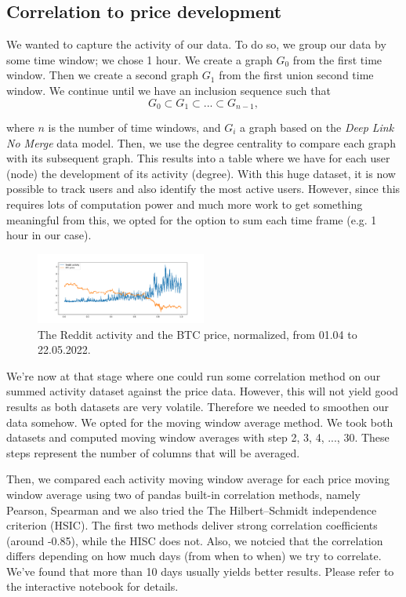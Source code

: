 \subsection{Correlation to price development}

We wanted to capture the activity of our data. To do so, we group our data by some time window; we chose 1 hour. We create a graph $G_0$ from the first time window. Then we create a second graph $G_1$ from the first union second time window. We continue until we have an inclusion sequence such that 
$$ G_0 \subset G_1 \subset  ... \subset G_{n-1},$$

where $n$ is the number of time windows, and $G_i$ a graph based on the \textit{Deep Link No Merge} data model.
Then, we use the degree centrality to compare each graph with its subsequent graph. This results into a table where we have for each user (node) the development of its activity (degree). With this huge dataset, it is now possible to track users and also identify the most active users. However, since this requires lots of computation power and much more work to get something meaningful from this, we opted for the option to sum each time frame (e.g. 1 hour in our case). 

\begin{figure}[H]
    \centering
    \includegraphics[width=0.5\textwidth]{figures/activity_x_price.pdf}
    \caption{The Reddit activity and the BTC price, normalized, from 01.04 to 22.05.2022.}
\end{figure}


We're now at that stage where one could run some correlation method on our summed activity dataset against the price data. However, this will not yield good results as both datasets are very volatile. Therefore we needed to smoothen our data somehow. We opted for the moving window average method. We took both datasets and computed moving window averages with step 2, 3, 4, ..., 30. These steps represent the number of columns that will be averaged. 

Then, we compared each activity moving window average for each price moving window average using two of pandas built-in correlation methods, namely Pearson, Spearman and we also tried the The Hilbert–Schmidt independence criterion (HSIC). The first two methods deliver strong correlation coefficients (around -0.85), while the HISC does not. Also, we notcied that the correlation differs depending on how much days (from when to when) we try to correlate. We've found that more than 10 days usually yields better results. Please refer to the interactive notebook for details.


